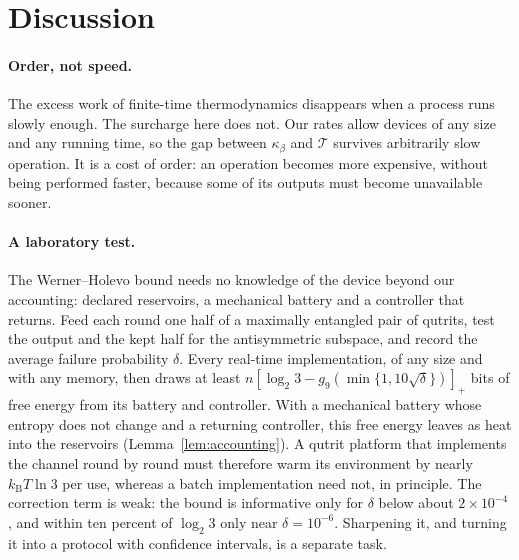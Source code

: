 \documentclass[11pt]{article}
\theoremstyle{definition}
\theoremstyle{remark}
\newcommand{\kB}{k_{\mathrm B}}
\newcommand{\Tcap}{\mathcal T}
\newcommand{\Trt}{\kappa_\beta}
\begin{document}
\section{Discussion}\label{sec:discussion}

\paragraph{Order, not speed.} The excess work of finite-time thermodynamics disappears when a process runs slowly enough. The surcharge here does not. Our rates allow devices of any size and any running time, so the gap between $\Trt$ and $\Tcap$ survives arbitrarily slow operation. It is a cost of order: an operation becomes more expensive, without being performed faster, because some of its outputs must become unavailable sooner.

\paragraph{A laboratory test.} The Werner--Holevo bound needs no knowledge of the device beyond our accounting: declared reservoirs, a mechanical battery and a controller that returns. Feed each round one half of a maximally entangled pair of qutrits, test the output and the kept half for the antisymmetric subspace, and record the average failure probability $\delta$. Every real-time implementation, of any size and with any memory, then draws at least $n[\log_2 3-g_9(\min\{1,10\sqrt\delta\})]_+$ bits of free energy from its battery and controller. With a mechanical battery whose entropy does not change and a returning controller, this free energy leaves as heat into the reservoirs (Lemma~\ref{lem:accounting}). A qutrit platform that implements the channel round by round must therefore warm its environment by nearly $\kB T\ln 3$ per use, whereas a batch implementation need not, in principle. The correction term is weak: the bound is informative only for $\delta$ below about $2\times10^{-4}$, and within ten percent of $\log_2 3$ only near $\delta=10^{-6}$. Sharpening it, and turning it into a protocol with confidence intervals, is a separate task.
\end{document}
